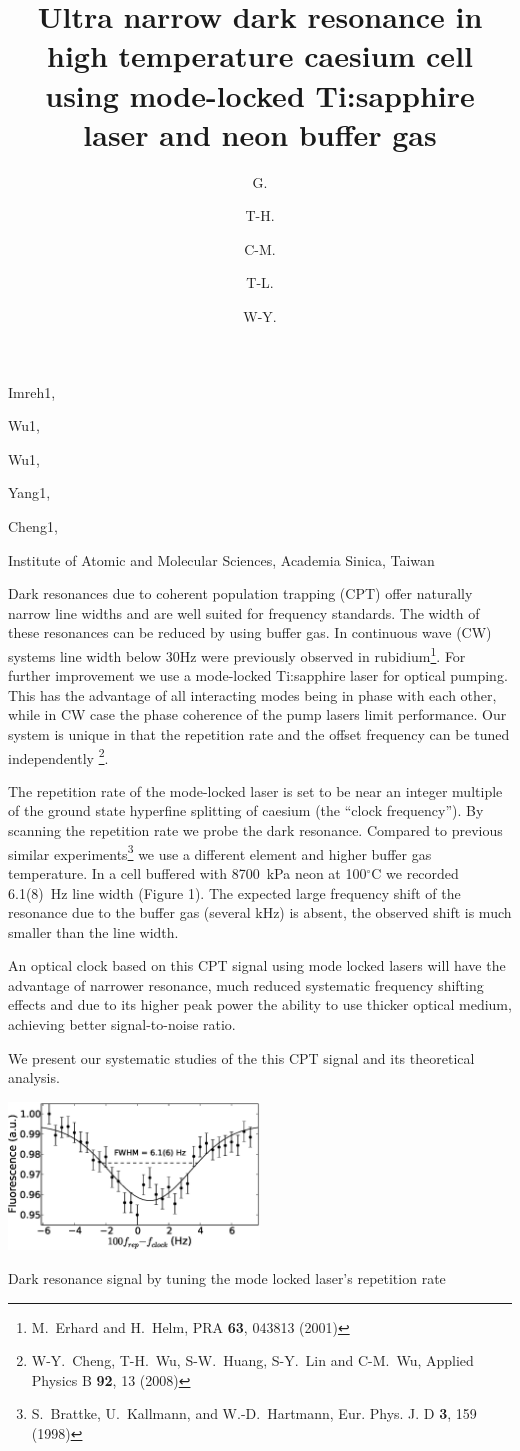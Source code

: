 \documentclass[10pt]{article}
\begin{document}

\title{Ultra narrow dark resonance in high temperature caesium cell using mode-locked Ti:sapphire laser and neon buffer gas}

\begin{authors}
  \author{G.}{Imreh}{1},
  \author{T-H.}{Wu}{1},
  \author{C-M.}{Wu}{1},
  \author{T-L.}{Yang}{1},
  \author{W-Y.}{Cheng}{1},
\end{authors}

\address{1}{Institute of Atomic and Molecular Sciences, Academia Sinica, Taiwan}

\begintext

Dark resonances due to coherent population trapping (CPT) offer naturally narrow line widths and are well suited for frequency standards. The width of these resonances can be reduced by using buffer gas. In continuous wave (CW) systems line width below 30Hz were previously observed in rubidium\footnote{M.~Erhard and H.~Helm, PRA {\bf 63}, 043813 (2001)}. For further improvement we use a mode-locked Ti:sapphire laser for optical pumping. This has the advantage of all interacting modes being in phase with each other, while in CW case the phase coherence of the pump lasers limit performance. Our system is unique in that the repetition rate and the offset frequency can be tuned independently \footnote{W-Y.~Cheng, T-H.~Wu, S-W.~Huang, S-Y.~Lin and C-M.~Wu, Applied Physics B {\bf 92}, 13 (2008)}. 

The repetition rate of the mode-locked laser is set to be near an integer multiple of the ground state hyperfine splitting of caesium (the ``clock frequency''). By scanning the repetition rate we probe the dark resonance. Compared to previous similar experiments\footnote{S.~Brattke, U.~Kallmann, and W.-D.~Hartmann,  Eur. Phys. J. D {\bf 3}, 159 (1998)} we use a different element and higher buffer gas temperature. In a cell buffered with 8700~kPa neon at 100$^\circ$C we recorded 6.1(8)~Hz line width (Figure 1). The expected large frequency shift of the resonance due to the buffer gas (several kHz) is absent, the observed shift is much smaller than the line width.

An optical clock based on this CPT signal using mode locked lasers will have the advantage of narrower resonance, much reduced systematic frequency shifting effects and due to its higher peak power the ability to use thicker optical medium, achieving better signal-to-noise ratio.

We present our systematic studies of the this CPT signal and its theoretical analysis.

\begin{center}
  \includegraphics[width=0.5\textwidth]{8700Ne_buffer.eps}
\end{center}

\caption{1}{Dark resonance signal by tuning the mode locked laser's repetition rate}

\end{document}
